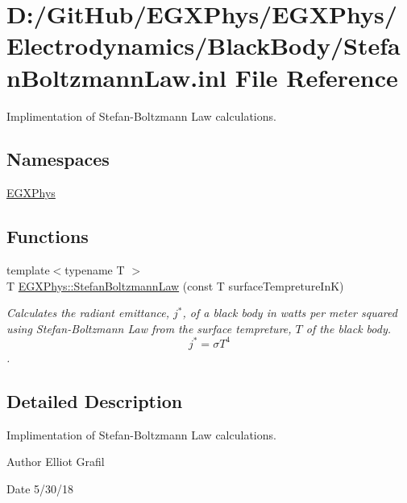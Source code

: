 \hypertarget{_stefan_boltzmann_law_8inl}{}\section{D\+:/\+Git\+Hub/\+E\+G\+X\+Phys/\+E\+G\+X\+Phys/\+Electrodynamics/\+Black\+Body/\+Stefan\+Boltzmann\+Law.inl File Reference}
\label{_stefan_boltzmann_law_8inl}


Implimentation of Stefan-\/\+Boltzmann Law calculations.  


\subsection*{Namespaces}
\begin{DoxyCompactItemize}
\item 
 \mbox{\hyperlink{namespace_e_g_x_phys}{E\+G\+X\+Phys}}
\end{DoxyCompactItemize}
\subsection*{Functions}
\begin{DoxyCompactItemize}
\item 
{\footnotesize template$<$typename T $>$ }\\T \mbox{\hyperlink{group___e_g_x_phys-_electrodynamics-_black_body-_stefan_boltzmann_law_gadfc1c4242b5364a747169569ae5c84ef}{E\+G\+X\+Phys\+::\+Stefan\+Boltzmann\+Law}} (const T surface\+Tempreture\+InK)
\begin{DoxyCompactList}\small\item\em Calculates the radiant emittance, $j^*$, of a black body in watts per meter squared using Stefan-\/\+Boltzmann Law from the surface tempreture, $T$ of the black body. \[j^*=\sigma T^4\]. \end{DoxyCompactList}\end{DoxyCompactItemize}


\subsection{Detailed Description}
Implimentation of Stefan-\/\+Boltzmann Law calculations. 

\begin{DoxyAuthor}{Author}
Elliot Grafil 
\end{DoxyAuthor}
\begin{DoxyDate}{Date}
5/30/18 
\end{DoxyDate}
